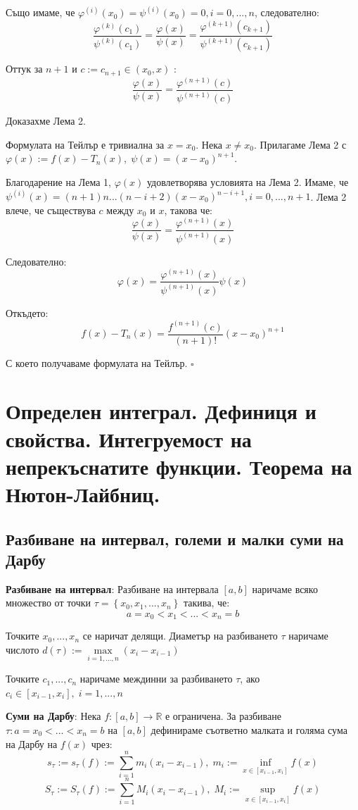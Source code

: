 \documentclass{article}
\renewcommand{\\}{\newline}
\newcommand{\proven}{\hfill $\square$}
\begin{document}
Също имаме, че \(\varphi^{(i)}(x_0) = \psi^{(i)}(x_0) = 0, i = 0, ..., n\), следователно:
\[
  \frac{\varphi^{(k)}(c_1)}{\psi^{(k)}(c_1)} =  \frac{\varphi(x)}{\psi(x)} = \frac{\varphi^{(k+1)}(c_{k+1})}{\psi^{(k+1)}(c_{k+1})}
\] 

Оттук за \(n+1\) и \(c := c_{n+1} \in (x_0, x)\)  : \[
 \frac{\varphi(x)}{\psi(x)} = \frac{\varphi^{(n+1)}(c)}{\psi^{(n+1)}(c)}
\]  

Доказахме Лема 2.

Формулата на Тейлър е тривиална за \(x = x_0\). Нека \(x\not=x_0\). Прилагаме Лема 2 с \(\varphi(x) := f(x) - T_n(x),\; \psi(x) = (x- x_0)^{n+1}\). 

Благодарение на Лема 1, \(\varphi(x)\) удовлетворява условията на Лема 2. Имаме, че \(\psi^{(i)}(x) = (n+1)n...(n-i+2)(x-x_0)^{n-i+1}, i = 0,...,n+1 \). Лема 2 влече, че съществува \(c\) между \(x_0\) и \(x\), такова че: \[
  \frac{\varphi(x)}{\psi(x)} = \frac{\varphi^{(n+1)}(x)}{\psi^{(n+1)}(x)}
\] 

Следователно: \[
  \varphi(x) =  \frac{\varphi^{(n+1)}(x)}{\psi^{(n+1)}(x)}\psi(x)
\] 

Откъдето:\[
  f(x) - T_n(x) = \frac{f^{(n+1)}(c)}{(n+1)!}(x-x_0)^{n+1}
\] 

С което получаваме формулата на Тейлър. \proven
\newpage
\section{Определен интеграл. Дефиниця и свойства. Интегруемост на непрекъснатите функции. Теорема на Нютон-Лайбниц.}
\subsection{Разбиване на интервал, големи и малки суми на Дарбу}
\textbf{Разбиване на интервал}: Разбиване на интервала \([a, b]\) наричаме всяко множество от точки \(\tau = \left\{x_0, x_1, ..., x_n\right\}\) такива, че: \[
  a = x_0 < x_1 < ... < x_n = b
\] 

Точките \(x_0, ..., x_n\) се наричат делящи. Диаметър на разбиването \(\tau\) наричаме числото \(d(\tau) := \underset{i=1,...,n}{\max}(x_i - x_{i-1})\)  

Точките \(c_1, ..., c_n\) наричаме междинни за разбиването \(\tau\), ако \(c_i \in [x_{i-1}, x_i],\; i = 1,...,n\)    

\textbf{Суми на Дарбу}: Нека \(f: [a, b] \to \mathbb{R}\) е ограничена. За разбиване \(\tau: a = x_0 < ... < x_n = b\) на \([a, b]\) дефинираме съответно малката и голяма сума на Дарбу на \(f(x)\) чрез:\[
  s_{\tau} := s_{\tau}(f) := \sum_{i=1}^{n}m_{i}(x_i - x_{i-1}),\; m_{i} := \underset{x\in[x_{i-1}, x_{i}]}{\inf}f(x)
\]     
\[
  S_{\tau} := S_{\tau}(f) := \sum_{i=1}^{n}M_{i}(x_i - x_{i-1}),\; M_{i} := \underset{x\in[x_{i-1}, x_{i}]}{\sup}f(x)
\]     
\end{document}
